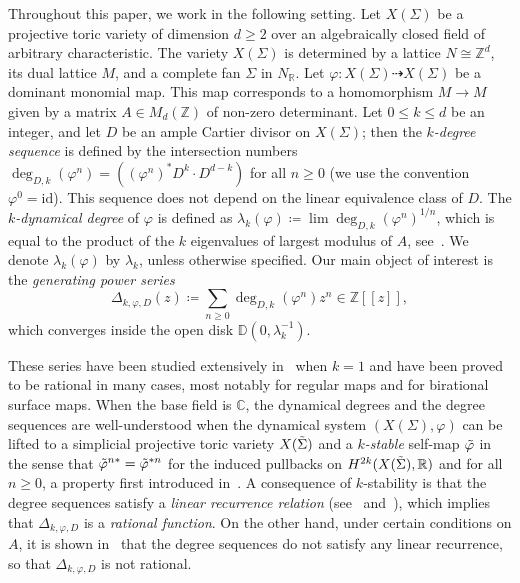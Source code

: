 \documentclass[11pt,a4paper]{article}
\theoremstyle{plain}
\theoremstyle{remark}
\theoremstyle{custombold}
\begin{document}
 Throughout this paper, we work in the following setting.
Let $X(\Sigma)$ be a projective toric variety of dimension $d\geq2$ over an algebraically closed field of arbitrary characteristic. The variety $X(\Sigma)$ is determined by a lattice $N\cong\mathbb Z^d$, its dual lattice $M$, and a complete fan $\Sigma$ in $N_{\mathbb R}$. Let $\varphi\colon X(\Sigma)\dashrightarrow X(\Sigma)$ be a dominant monomial map. This map corresponds to a homomorphism $M\rightarrow M$ given by a matrix $A\in {M}_d(\mathbb Z)$ of non-zero determinant. Let $0\leq k\leq d$ be an integer, and let $D$ be an ample Cartier divisor on $X(\Sigma)$; then the \emph{$k$-degree sequence} is defined by the intersection numbers $\deg_{D,k}(\varphi^n)=((\varphi^n)^*D^k\cdot D^{d-k})$ for all $n\geq 0$ (we use the convention $\varphi^0=\mathrm{id}$). This sequence does not depend on the linear equivalence class of $D$. The \emph{$k$-dynamical degree} of $\varphi$ is defined as $\lambda_k(\varphi)\coloneqq \lim \deg_{D,k}(\varphi^n)^{{1}/{n}}$, which is equal to the product of the $k$ eigenvalues of largest modulus of $A$, see~\cite{Hasselblatt-Propp-2007,Favre-Wulcan-2012,Lin-2012-BSMF}. We denote $\lambda_k(\varphi)$ by $\lambda_k$, unless otherwise specified. Our main object of interest is the \emph{generating power series}
$$\Delta_{k,\varphi,D}(z)\coloneqq \sum_{n\geq0}\deg_{D,k}(\varphi^n)z^n\in\mathbb Z[[z]],$$ which converges inside the open disk $\mathbb D(0,\lambda_k^{-1})$. 

These series have been studied extensively in~\cite{Abarenkova-Auriac-Boukraa-Maillard-1999,Boukraa-Hassani-Maillard-2003} when $k=1$ and have been proved to be rational in many cases, most notably for regular maps and for birational surface maps. When the base field is $\mathbb C$, the dynamical degrees and the degree sequences are well-understood when the dynamical system $(X(\Sigma),\varphi)$ can be lifted to a simplicial projective toric variety $X(\Tilde{\Sigma})$ and a \emph{$k$-stable} self-map $\Tilde{\varphi}$ in the sense that $\Tilde{\varphi}^{n*}=\Tilde{\varphi}^{*n}$ for the induced pullbacks on $H^{2k}(X(\Tilde{\Sigma}),\mathbb R)$ and for all $n\geq0$, a property first introduced in~\cite{Fornaess-Sibony-1995}. A consequence of  $k$-stability is that the degree sequences satisfy a \emph{linear recurrence relation} (see~\cite[Corollary~2.2]{Diller-Favre-2001} and~\cite[Proposition~6.3]{Lin-Wulcan-2014}), which implies that $\Delta_{k,\varphi,D}$ is a \emph{rational function}. On the other hand, under certain conditions on $A$, it is shown in~\cite{Bedford-Kim-2004,Hasselblatt-Propp-2007,Lin-Wulcan-2014} that the degree sequences do not satisfy any linear recurrence, so that  $\Delta_{k,\varphi,D}$ is not rational.
\end{document}
